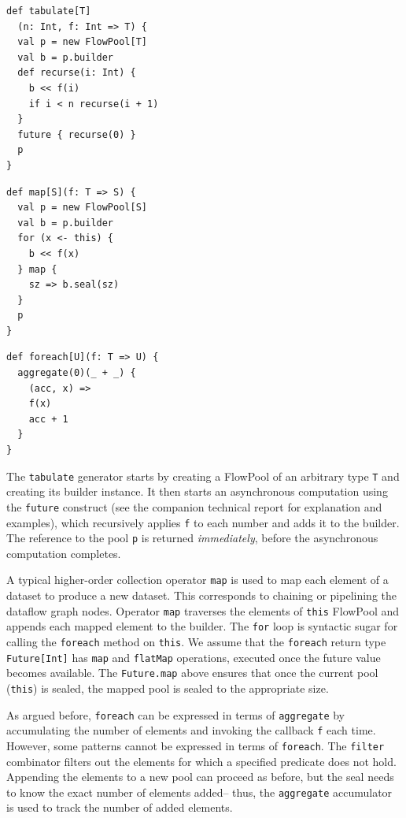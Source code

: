 \noindent
\begin{minipage}[t]{5.2 cm}
\begin{verbatim}
def tabulate[T]
  (n: Int, f: Int => T) {
  val p = new FlowPool[T]
  val b = p.builder
  def recurse(i: Int) {
    b << f(i)
    if i < n recurse(i + 1)
  }
  future { recurse(0) }
  p
}
\end{verbatim}
\end{minipage}\begin{minipage}[t]{5 cm}
\begin{verbatim}
def map[S](f: T => S) {
  val p = new FlowPool[S]
  val b = p.builder
  for (x <- this) {
    b << f(x)
  } map {
    sz => b.seal(sz)
  }
  p
}
\end{verbatim}
\end{minipage}
\begin{minipage}[t]{4 cm}
\begin{verbatim}
def foreach[U](f: T => U) {
  aggregate(0)(_ + _) {
    (acc, x) =>
    f(x)
    acc + 1
  }
}
\end{verbatim}
\end{minipage}

The \verb=tabulate= generator starts by creating a FlowPool of an
arbitrary type \verb=T= and creating its builder instance.
It then starts an asynchronous computation using the \verb=future=
construct (see the companion technical report \cite{Prokopec12}
for explanation and examples), which recursively applies \verb=f= to each number and
adds it to the builder.
The reference to the pool \verb=p= is returned \emph{immediately},
before the asynchronous computation completes.

A typical higher-order collection operator \verb=map= is used to
map each element of a dataset to produce a new dataset.
This corresponds to chaining or pipelining the dataflow graph nodes.
Operator \verb=map= traverses the elements of \verb=this= FlowPool
and appends each mapped element to the builder.
The \verb=for= loop is syntactic sugar for calling the
\verb=foreach= method on \verb=this=.
We assume that the \verb=foreach= return type \verb=Future[Int]=
has \verb=map= and \verb=flatMap= operations, executed
once the future value becomes available.
The \verb=Future.map= above ensures that once the current pool (\verb=this=) is
sealed, the mapped pool is sealed to the appropriate size.

As argued before, \verb=foreach= can be expressed in terms of
\verb=aggregate= by accumulating the number of elements and invoking the
callback \verb=f= each time.
However, some patterns cannot be expressed in terms of \verb=foreach=.
The \verb=filter= combinator filters out the elements for which a
specified predicate does not hold.
Appending the elements to a new pool can proceed as
before, but the seal needs to know the exact number of elements added--
thus, the \verb=aggregate= accumulator is used to track the number
of added elements.

